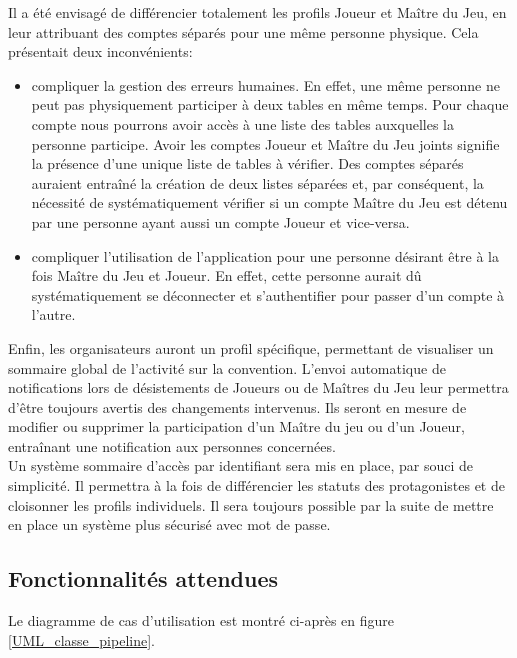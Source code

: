 \documentclass[11pt]{article}
\begin{document}
\indent Il a été envisagé de différencier totalement les profils Joueur et Maître du Jeu, en leur attribuant des comptes séparés pour une même personne physique. Cela présentait deux inconvénients:
\begin{itemize}
\item{compliquer la gestion des erreurs humaines. En effet, une même personne ne peut pas physiquement participer à deux tables en même temps. Pour chaque compte nous pourrons avoir accès à une liste des tables auxquelles la personne participe. Avoir les comptes Joueur et Maître du Jeu joints signifie la présence d'une unique liste de tables à vérifier. Des comptes séparés auraient entraîné la création de deux listes séparées et, par conséquent, la nécessité de systématiquement vérifier si un compte Maître du Jeu est détenu par une personne ayant aussi un compte Joueur et vice-versa.}
\item{compliquer l'utilisation de l'application pour une personne désirant être à la fois Maître du Jeu et Joueur. En effet, cette personne aurait dû systématiquement se déconnecter et s'authentifier pour passer d'un compte à l'autre.\\}
\end{itemize}

Enfin, les organisateurs auront un profil spécifique, permettant de visualiser un sommaire global de l'activité sur la convention. L'envoi automatique de notifications lors de désistements de Joueurs ou de Maîtres du Jeu leur permettra d'être toujours avertis des changements intervenus. Ils seront en mesure de modifier ou supprimer la participation d'un Maître du jeu ou d'un Joueur, entraînant une notification aux personnes concernées.\\

Un système sommaire d'accès par identifiant sera mis en place, par souci de simplicité. Il permettra à la fois de différencier les statuts des protagonistes et de cloisonner les profils individuels. Il sera toujours possible par la suite de mettre en place un système plus sécurisé avec mot de passe. \\



\subsection{Fonctionnalités attendues}

Le diagramme de cas d'utilisation est montré ci-après en figure \ref{UML_classe_pipeline}. \\
\end{document}

